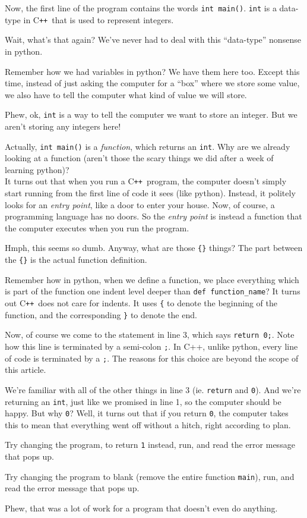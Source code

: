 \documentclass{article}
\newcommand{\CC}{C\texttt{++}}
\begin{document}
\newpage

Now, the first line of the program contains the words \lstinline{int main()}.
\lstinline{int} is a data-type in \CC\ that is used to represent integers.

Wait, what's that again?
We've never had to deal with this ``data-type'' nonsense in python.

Remember how we had variables in python?
We have them here too.
Except this time, instead of just asking the computer for a ``box''
where we store some value, we also have to tell the computer what kind of 
value we will store.

Phew, ok, \lstinline{int} is a way to tell the computer we want to store an
integer. But we aren't storing any integers here!

Actually, \lstinline{int main()} is a \emph{function}, which returns an \lstinline{int}.
Why are we already looking at a function (aren't those the scary things we did
after a week of learning python)? \\
It turns out that when you run a \CC\ program, the computer doesn't simply start
running from the first line of code it sees (like python).
Instead, it politely looks for an \emph{entry point}, like a door to enter your house.
Now, of course, a programming language has no doors. So the \emph{entry point}
is instead a function that the computer executes when you run the program.

Hmph, this seems so dumb.
Anyway, 
what are those \verb|{}| things?
The part between the \verb|{}| is the actual function definition.

Remember how in python, when we define a function, we place everything which is part
of the function one indent level deeper than \verb|def function_name|?
It turns out \CC\ does not care for indents.
It uses \verb|{| to denote the beginning of the function, and the corresponding \verb|}|
to denote the end.

Now, of course we come to the statement in line 3, which says \lstinline{return 0;}.
Note how this line is terminated by a semi-colon \lstinline{;}.
In C++, unlike python, every line of code is terminated by a \lstinline{;}.
The reasons for this choice are beyond the scope of this article.

We're familiar with all of the other things in line 3 (ie. \lstinline{return} and
\lstinline{0}).
And we're returning an \lstinline{int}, just like we promised in line 1, so the 
computer should be happy.
But why \lstinline{0}? Well, it turns out that if you return \lstinline{0}, 
the computer takes this to mean that everything went off without a hitch, right according to plan.

Try changing the program, to return \lstinline{1} instead, run, and read the error message that pops up.

Try changing the program to blank (remove the entire function \lstinline{main}), run, and read the error message
that pops up.

Phew, that was a lot of work for a program that doesn't even do anything.
\end{document}
